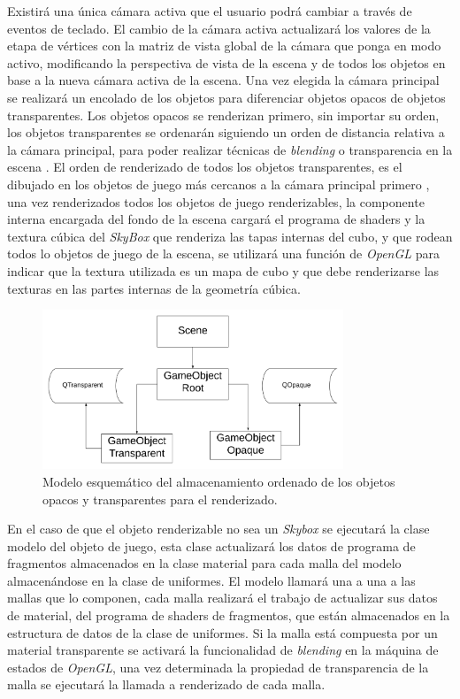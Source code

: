 \documentclass[a4paper]{book}
\begin{document}
Existirá una única cámara activa que el usuario podrá cambiar a través de eventos de teclado. El cambio de la cámara activa actualizará los
valores de la etapa de vértices con la matriz de vista global de la cámara que ponga en modo activo, modificando la perspectiva de vista de
la escena y de todos los objetos en base a la nueva cámara activa de la escena. Una vez elegida la cámara principal se realizará un encolado
de los objetos para diferenciar objetos opacos de objetos transparentes. Los objetos opacos se renderizan primero, sin importar su orden,
los objetos transparentes se ordenarán siguiendo un orden de distancia relativa a la cámara principal, para poder realizar técnicas de
\textit{blending} o transparencia en la escena \cite{blend:_alpha_factor}. El orden de renderizado de todos los objetos transparentes, es el dibujado en los objetos
de juego más cercanos a la cámara principal primero \cite{article:_transparnet_shadows}, una vez renderizados todos los objetos de juego renderizables, la componente interna
encargada del fondo de la escena cargará el programa de shaders y la textura cúbica del \textit{SkyBox} que renderiza las tapas internas del
cubo, y que rodean todos lo objetos de juego de la escena, se utilizará una función de \textit{OpenGL} para indicar que la textura utilizada
es un mapa de cubo y que debe renderizarse las texturas en las partes internas de la geometría cúbica.

\begin{figure}[H]
    \centering
    \includegraphics[width=9cm, keepaspectratio]{img/RenderQueue.png}
    \caption{Modelo esquemático del almacenamiento ordenado de los objetos opacos y transparentes para el renderizado.}
    \label{RenderQueue}
\end{figure}

En el caso de que el objeto renderizable no sea un \textit{Skybox} se ejecutará la clase modelo del objeto de juego,
esta clase actualizará los datos de programa de fragmentos almacenados en la clase material para cada malla del modelo almacenándose en la
clase de uniformes. El modelo llamará una a una a las mallas que lo componen, cada malla realizará el trabajo de actualizar sus datos de
material, del programa de shaders de fragmentos, que están almacenados en la estructura de datos de la clase de uniformes. Si la malla está
compuesta por un material transparente se activará la funcionalidad de \textit{blending} en la máquina de estados de \textit{OpenGL}, una vez
determinada la propiedad de transparencia de la malla se ejecutará la llamada a renderizado de cada malla.
\end{document}
